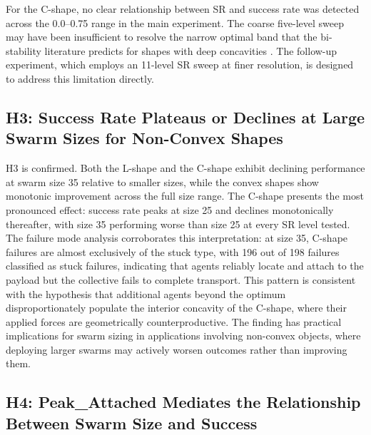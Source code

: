 For the C-shape, no clear relationship between SR and success rate was detected across the 0.0--0.75 range in the main experiment. The coarse five-level sweep may have been insufficient to resolve the narrow optimal band that the bi-stability literature predicts for shapes with deep concavities \citep{springer2022}. The follow-up experiment, which employs an 11-level SR sweep at finer resolution, is designed to address this limitation directly.

\subsection*{H3: Success Rate Plateaus or Declines at Large Swarm Sizes for Non-Convex Shapes}

H3 is confirmed. Both the L-shape and the C-shape exhibit declining performance at swarm size 35 relative to smaller sizes, while the convex shapes show monotonic improvement across the full size range. The C-shape presents the most pronounced effect: success rate peaks at size 25 and declines monotonically thereafter, with size 35 performing worse than size 25 at every SR level tested. The failure mode analysis corroborates this interpretation: at size 35, C-shape failures are almost exclusively of the stuck type, with 196 out of 198 failures classified as stuck failures, indicating that agents reliably locate and attach to the payload but the collective fails to complete transport. This pattern is consistent with the hypothesis that additional agents beyond the optimum disproportionately populate the interior concavity of the C-shape, where their applied forces are geometrically counterproductive. The finding has practical implications for swarm sizing in applications involving non-convex objects, where deploying larger swarms may actively worsen outcomes rather than improving them.

\subsection*{H4: Peak\_Attached Mediates the Relationship Between Swarm Size and Success}

